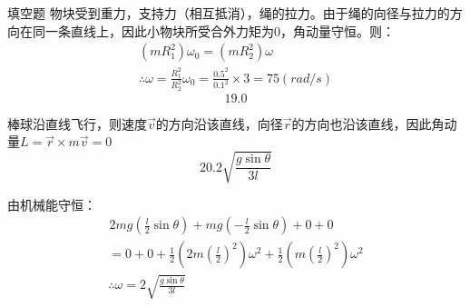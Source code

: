 \documentclass[a4paper,fleqn,twocolumn]{ctexart}
\begin{document}
\begin{section}{填空题}
		物块受到重力，支持力（相互抵消），绳的拉力。由于绳的向径与拉力的方向在同一条直线上，因此小物块所受合外力矩为0，角动量守恒。则：
		\begin{gather*}
			(mR_1^2)\omega_0=(mR_2^2)\omega\\
			\therefore \omega=\frac{R_1^2}{R_2^2}\omega_0=\frac{0.5^2}{0.1^2}\times 3=75(rad/s)
		\end{gather*}
		\[19.0\]\par
		棒球沿直线飞行，则速度$ \vec{v} $的方向沿该直线，向径$ \vec{r} $的方向也沿该直线，因此角动量$ L=\vec{r}\times m\vec{v}=0 $
		\[20.2\sqrt{\frac{g\sin\theta}{3l}}\]\par
		由机械能守恒：
		\begin{gather*}
			\hspace{1pt}2mg\left(\frac{l}{2}\sin\theta\right)+mg\left(-\frac{l}{2}\sin\theta\right)+0+0\\
			=0+0+\frac{1}{2}\left(2m\left(\frac{l}{2}\right)^2\right)\omega^2+\frac{1}{2}\left(m\left(\frac{l}{2}\right)^2\right)\omega^2\\
			\therefore \omega=2\sqrt{\frac{g\sin\theta}{3l}}
		\end{gather*}
		
	\end{section}
\end{document}
